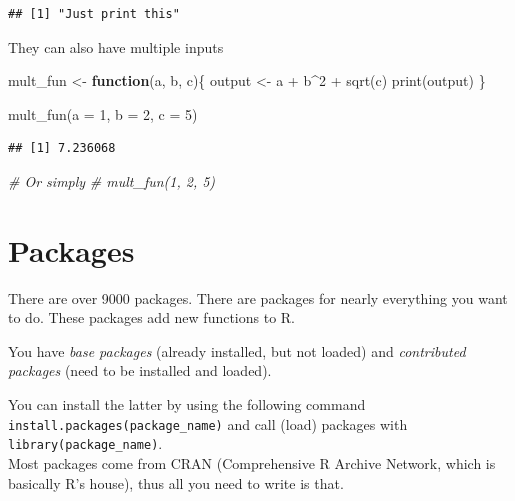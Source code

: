 \documentclass[
]{book}
\newenvironment{Shaded}{\begin{snugshade}}{\end{snugshade}}
\newcommand{\AttributeTok}[1]{\textcolor[rgb]{0.77,0.63,0.00}{#1}}
\newcommand{\CommentTok}[1]{\textcolor[rgb]{0.56,0.35,0.01}{\textit{#1}}}
\newcommand{\ControlFlowTok}[1]{\textcolor[rgb]{0.13,0.29,0.53}{\textbf{#1}}}
\newcommand{\DecValTok}[1]{\textcolor[rgb]{0.00,0.00,0.81}{#1}}
\newcommand{\FunctionTok}[1]{\textcolor[rgb]{0.00,0.00,0.00}{#1}}
\newcommand{\NormalTok}[1]{#1}
\newcommand{\OtherTok}[1]{\textcolor[rgb]{0.56,0.35,0.01}{#1}}
\newcommand{\SpecialCharTok}[1]{\textcolor[rgb]{0.00,0.00,0.00}{#1}}
\begin{document}
\begin{verbatim}
## [1] "Just print this"
\end{verbatim}

They can also have multiple inputs

\begin{Shaded}
\begin{Highlighting}[]
\NormalTok{mult\_fun }\OtherTok{\textless{}{-}} \ControlFlowTok{function}\NormalTok{(a, b, c)\{}
\NormalTok{  output }\OtherTok{\textless{}{-}}\NormalTok{ a }\SpecialCharTok{+}\NormalTok{ b}\SpecialCharTok{\^{}}\DecValTok{2} \SpecialCharTok{+} \FunctionTok{sqrt}\NormalTok{(c)}
  \FunctionTok{print}\NormalTok{(output)}
\NormalTok{\}}

\FunctionTok{mult\_fun}\NormalTok{(}\AttributeTok{a =} \DecValTok{1}\NormalTok{, }\AttributeTok{b =} \DecValTok{2}\NormalTok{, }\AttributeTok{c =} \DecValTok{5}\NormalTok{)}
\end{Highlighting}
\end{Shaded}

\begin{verbatim}
## [1] 7.236068
\end{verbatim}

\begin{Shaded}
\begin{Highlighting}[]
\CommentTok{\# Or simply}
\CommentTok{\# mult\_fun(1, 2, 5)}
\end{Highlighting}
\end{Shaded}

\hypertarget{packages}{%
\section{Packages}\label{packages}}

There are over 9000 packages.
There are packages for nearly everything you want to do.
These packages add new functions to R.

You have \emph{base packages} (already installed, but not loaded) and \emph{contributed packages} (need to be installed and loaded).

You can install the latter by using the following command \texttt{install.packages(\textquotesingle{}package\_name\textquotesingle{})} and call (load) packages with \texttt{library(package\_name)}.\\

Most packages come from CRAN (Comprehensive R Archive Network, which is basically R's house), thus all you need to write is that.
\end{document}
